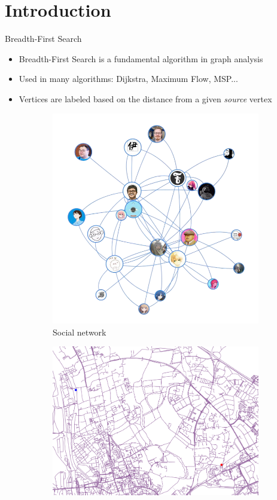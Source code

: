 \section{Introduction}

\begin{frame}{Breadth-First Search}
    \begin{itemize}
        \item Breadth-First Search is a fundamental algorithm in graph analysis
        \item Used in many algorithms: Dijkstra, Maximum Flow, MSP...
        \item Vertices are labeled based on the \alert{distance} from a given \textit{source} vertex
    \end{itemize}
    \begin{figure}
        \centering
        \begin{subfigure}[b]{0.32\textwidth}
            \centering
            \includegraphics[width=0.8\linewidth]{images/Collaboration network.png}
            \caption{Social network}
        \end{subfigure}
        \begin{subfigure}[b]{0.32\textwidth}
            \centering
            \includegraphics[width=1.05\linewidth]{images/roadnet.png}

\end{subfigure}
\end{figure}
\end{frame}
